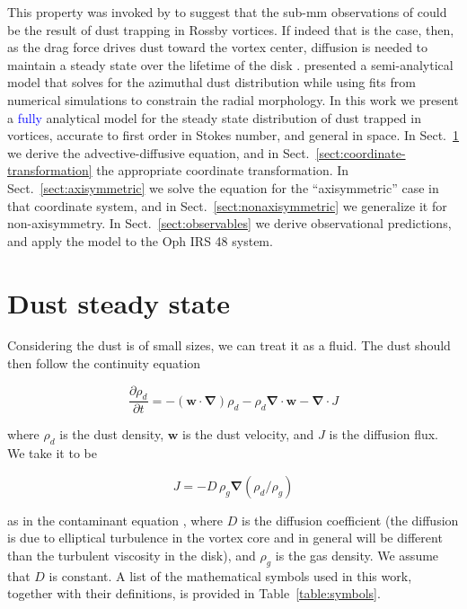 \documentclass[apj]{emulateapj}
\newcommand{\pderiv}[2]{\frac{\partial #1}{\partial #2}}
\renewcommand{\v}[1]{{\boldsymbol{#1}}} %
\def\blue#1{\textcolor{blue}{ #1}}
\newcommand{\del}{\v{\nabla}}
\newcommand{\grad}{\del}
\newcommand{\Div}{\del\cdot}
\newcommand{\sect}[1]{Sect.~\ref{#1}}
\newcommand{\beq}{\begin{equation}}
\newcommand{\eeq}{\end{equation}}
\begin{document}
This property was invoked by \citet{Regaly12} to suggest that the 
sub-mm observations of \citet{Brown09} could be the result of dust
trapping in Rossby vortices. If indeed that is the case, then, 
as the drag force drives dust toward the vortex center, diffusion is
needed to maintain a steady state over the lifetime of the disk
\citep{Klahr-Henning97,Chavanis00}. \citet{Birnstiel13} presented a semi-analytical model that solves for the azimuthal dust 
distribution while using fits from numerical simulations
\citep{Pinilla12b} to constrain the radial morphology. In this work we present a \blue{fully} analytical 
model for the steady state distribution of dust trapped in vortices, 
accurate to first order in Stokes number, and general in space. In 
\sect{sect:model-equations} we derive the
advective-diffusive equation, and in \sect{sect:coordinate-transformation} the appropriate coordinate
transformation. In \sect{sect:axisymmetric} we solve the equation for
the ``axisymmetric'' case in that coordinate system, and in
\sect{sect:nonaxisymmetric}  we generalize it for
non-axisymmetry. In \sect{sect:observables} 
we derive observational predictions, and apply the model to the Oph IRS 48 system.

\section{Dust steady state} 
\label{sect:model-equations}

Considering the dust is of small sizes, we can treat it as a
fluid. The dust should then follow the continuity equation 

\beq
  \pderiv{\rho_d}{t} = -(\v{w}\cdot\del)\rho_d - \rho_d \Div{\v{w}} - \Div{J}
  \label{eq:continuity-w}
\eeq

\noindent where $\rho_d$ is the dust density, $\v{w}$ is the dust
velocity, and $J$ is the diffusion flux. We take it to be
 
\beq 
J=-D\,\rho_g\grad{\left(\rho_d/\rho_g\right)}\label{eq:j-flux}
\eeq 

\noindent as in the contaminant equation
\citep{Morfill-Volk84,Clarke-Pringle88,Charnoz11}, where $D$ is the  
diffusion coefficient (the diffusion is due
to elliptical turbulence in the vortex core and in general will be
different than the turbulent viscosity in the disk), and $\rho_g$ is
the gas density. We assume that $D$ is constant. A list of the mathematical symbols used in this work, together
with their definitions, is provided in Table~\ref{table:symbols}. 
\end{document}
